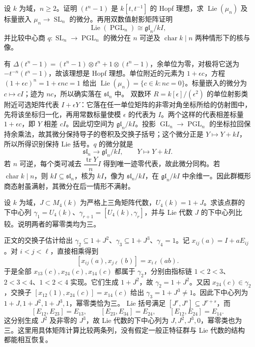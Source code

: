 \begin{optionalexercise}\label{b5:ex:21:15}
	设 \(k\) 为域，\(n\ge2\)。证明 \((t^n-1)\) 是 \(k[t,t^{-1}]\) 的 Hopf 理想，求 \(\operatorname{Lie}(\mu_n)\) 及标量嵌入 \(\mu_n\to\operatorname{SL}_n\) 的微分。再用双数值射影矩阵证明
	\[
		\operatorname{Lie}(\operatorname{PGL}_n)\cong\mathfrak{gl}_n/kI,
	\]
	并比较中心商 \(q:\operatorname{SL}_n\to\operatorname{PGL}_n\) 的微分在 \(n\) 可逆及 \(\operatorname{char}k\mid n\) 两种情形下的核与像。
\end{optionalexercise}
\begin{solution}
	有 \(\Delta(t^n-1)=(t^n-1)\otimes t^n+1\otimes(t^n-1)\)，余单位为零，对极将它送为 \(-t^{-n}(t^n-1)\)，故该理想是 Hopf 理想。单位附近的元素为 \(1+\epsilon c\)，方程 \((1+\epsilon c)^n=1+\epsilon nc=1\) 给出 \(\operatorname{Lie}(\mu_n)=\{c\in k:nc=0\}\)。标量嵌入的微分为 \(c\mapsto cI\)；迹为 \(nc\)，所以确实落在 \(\mathfrak{sl}_n\) 中。 双数环 \(R=k[\epsilon]/(\epsilon^2)\) 的单位射影类附近可选矩阵代表 \(I+\epsilon Y\)：它落在任一单位矩阵的非零对角坐标所给的仿射图中，先将该坐标归一化，再用常数标量使模 \(\epsilon\) 的代表为 \(I\)。两个这样的代表相差标量 \(1+\epsilon c\)，即 \(Y\) 相差 \(cI\)。因此切空间为 \(\mathfrak{gl}_n/kI\)。投影 \(\operatorname{GL}_n\to\operatorname{PGL}_n\) 的坐标拉回保持余乘法，故其微分保持导子的卷积及交换子括号；这个微分正是 \(Y\mapsto Y+kI\)，所以所得识别保持 Lie 括号。\(q\) 的微分就是
	\[
		\mathfrak{sl}_n\longrightarrow\mathfrak{gl}_n/kI,\qquad Y\longmapsto Y+kI.
	\]
	若 \(n\) 可逆，每个类可减去 \(\dfrac{\operatorname{tr}Y}{n}I\) 得到唯一迹零代表，故此微分同构。若 \(\operatorname{char}k\mid n\)，则 \(kI\subseteq\mathfrak{sl}_n\)，核为 \(kI\)，像为 \(\mathfrak{sl}_n/kI\)，在 \(\mathfrak{gl}_n/kI\) 中余维一。因此群概形商态射虽满射，其微分在后一情形不满射。
\end{solution}

\begin{optionalexercise}\label{b5:ex:21:16}
	设 \(k\) 为域，\(J\subset M_4(k)\) 为严格上三角矩阵代数，\(U_4(k)=1+J\)。求该点群的下中心列 \(\gamma_1=U_4(k)\)、\(\gamma_{r+1}=[U_4(k),\gamma_r]\)，并与 Lie 代数 \(J\) 的下中心列比较。说明两者的幂零类均为三。
\end{optionalexercise}
\begin{solution}
	正文的交换子估计给出 \(\gamma_2\subseteq1+J^2\)、\(\gamma_3\subseteq1+J^3\)、\(\gamma_4=1\)。记 \(x_{ij}(a)=I+aE_{ij}\)。对 \(i<j<\ell\)，直接相乘得到
	\[
		[x_{ij}(a),x_{j\ell}(b)]=x_{i\ell}(ab).
	\]
	于是全部 \(x_{13}(c),x_{24}(c),x_{14}(c)\) 都属于 \(\gamma_2\)，分别由指标链 \(1<2<3\)、\(2<3<4\)、\(1<2<4\) 实现。它们生成 \(1+J^2\)，故 \(\gamma_2=1+J^2\)。又因 \(x_{24}(c)\in\gamma_2\)，交换子 \([x_{12}(1),x_{24}(c)]=x_{14}(c)\) 给出 \(\gamma_3=1+J^3\ne1\)。因此下中心列为 \(1+J,1+J^2,1+J^3,1\)，幂零类恰为三。 Lie 括号满足 \([J^r,J^s]\subseteq J^{r+s}\)，而
	\[
		[E_{12},E_{23}]=E_{13},\qquad [E_{23},E_{34}]=E_{24},\qquad [E_{12},E_{24}]=E_{14}.
	\]
	这分别生成 \(J^2\) 及非零的 \(J^3\)，故 Lie 代数的下中心列为 \(J,J^2,J^3,0\)，幂零类也为三。这里用具体矩阵计算比较两条列，没有假定一般正特征群与 Lie 代数的结构都能相互恢复。
\end{solution}

